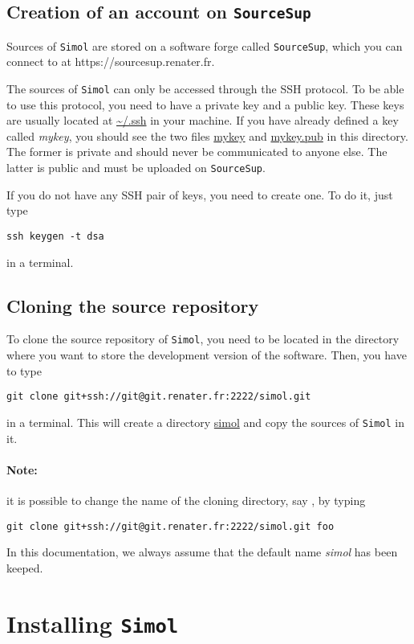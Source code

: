 \documentclass[12pt]{book}
\newcommand{\Simol}{\texttt{Simol}\xspace}
\newcommand{\SourceSup}{\texttt{SourceSup}\xspace}
\newcommand{\urlSourceSup}{https://sourcesup.renater.fr}
\begin{document}
\subsection{Creation of an account on \SourceSup}

Sources of \Simol are stored on a software forge called \SourceSup, which you can connect to at \urlSourceSup.  

The sources of \Simol can only be accessed through the SSH protocol. To be able to use this protocol, you need to have a private key and a public key. These keys are usually located at \url{~/.ssh} in your machine. If you have already defined a key called \textit{mykey}, you should see the two files \url{mykey} and \url{mykey.pub} in this directory. The former is private and should never be communicated to anyone else. The latter is public and must be uploaded on \SourceSup. 

If you do not have any SSH pair of keys, you need to create one. To do it, just type
\lstset{language=bash} 
\begin{lstlisting}
ssh keygen -t dsa
\end{lstlisting}
in a terminal.


\subsection{Cloning the source repository}

To clone the source repository of \Simol, you need to be located in the directory where you want to store the development version of the software. Then, you have to type
\lstset{language=bash} 
\begin{lstlisting}
git clone git+ssh://git@git.renater.fr:2222/simol.git
\end{lstlisting}
in a terminal. This will create a directory \url{simol} and copy the sources of \Simol in it. 

\paragraph{Note:}
it is possible to change the name of the cloning directory, say , by typing 
\lstset{language=bash} 
\begin{lstlisting}
git clone git+ssh://git@git.renater.fr:2222/simol.git foo
\end{lstlisting}
In this documentation, we always assume that the default name \textit{simol} has been keeped.

\section{Installing \Simol}
\end{document}
